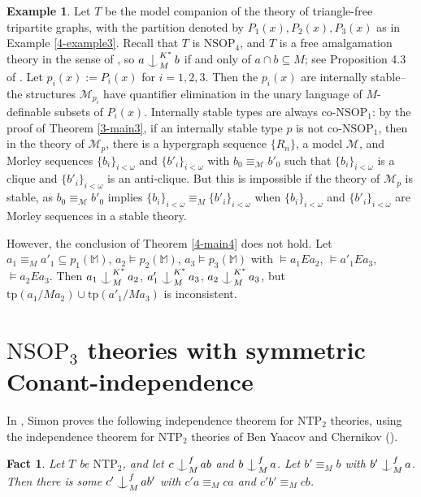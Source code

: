 \documentclass[12pt]{amsart}
\newtheorem{fact}[theorem]{Fact}
\theoremstyle{definition}
\newtheorem{example}[theorem]{Example}
\def\Ind#1#2{#1\setbox0=\hbox{$#1x$}\kern\wd0\hbox to 0pt{\hss$#1\mid$\hss}
\lower.9\ht0\hbox to 0pt{\hss$#1\smile$\hss}\kern\wd0}
\def\ind{\mathop{\mathpalette\Ind{}}}
\begin{document}
\begin{example}
    Let $T$ be the model companion of the theory of triangle-free tripartite graphs, with the partition denoted by $P_{1}(x), P_{2}(x), P_{3}(x)$ as in Example \ref{4-example3}. Recall that $T$ is $\mathrm{NSOP}_{4}$, and $T$ is a free amalgamation theory in the sense of \cite{Co15}, so $a \ind_{M}^{K^{*}} b$ if and only of $a \cap b \subseteq M$; see Proposition 4.3 of \cite{GFA}. Let $p_{i}(x) := P_{i}(x)$ for $i = 1, 2, 3$. Then the $p_{i}(x)$ are internally stable--the structures $\mathcal{M}_{p_{i}}$ have quantifier elimination in the unary language of $M$-definable subsets of $P_{i}(x)$. Internally stable types are always co-$\mathrm{NSOP}_{1}$: by the proof of Theorem \ref{3-main3}, if an internally stable type $p$ is not co-$\mathrm{NSOP}_{1}$, then in the theory of $\mathcal{M}_{p}$, there is a hypergraph sequence $\{R_{n}\}$, a model $\mathcal{M}$, and Morley sequences $\{b_{i}\}_{i < \omega}$ and $\{b'_{i}\}_{i < \omega}$ with $b_{0} \equiv_{\mathcal{M}}b'_{0}$ such that $\{b_{i}\}_{i < \omega}$ is a clique and $\{b'_{i}\}_{i < \omega}$ is an anti-clique. But this is impossible if the theory of $\mathcal{M}_{p}$ is stable, as $b_{0} \equiv_{\mathcal{M}}b'_{0}$ implies $\{b_{i}\}_{i < \omega} \equiv_{M} \{b'_{i}\}_{i < \omega}$ when $\{b_{i}\}_{i < \omega}$ and $\{b'_{i}\}_{i < \omega}$ are Morley sequences in a stable theory.

    However, the conclusion of Theorem \ref{4-main4} does not hold.  Let $a_{1} \equiv_{M} a'_{1} \subseteq p_{1}(\mathbb{M})$, $ a_{2} \models p_{2}(\mathbb{M})$,  $ a_{3} \models p_{3}(\mathbb{M})$ with $\models a_{1} E a_{2}$, $\models a'_{1} E a_{3}$, $\models a_{2} E a_{3}$. Then $a_{1} \ind^{K^{*}}_{M} a_{2}$, $a'_{1} \ind^{K^{*}}_{M} a_{3}$, $a_{2} \ind^{K^{*}}_{M} a_{3}$, but $\mathrm{tp}(a_{1}/Ma_{2}) \cup \mathrm{tp}(a'_{1}/Ma_{3})$ is inconsistent.
\end{example}


\section{$\mathrm{NSOP}_{3}$ theories with symmetric Conant-independence}

In \cite{Sim20}, Simon proves the following independence theorem for $\mathrm{NTP}_{2}$ theories, using the independence theorem for $\mathrm{NTP}_{2}$ theories of Ben Yaacov and Chernikov (\cite{BYC07}).

\begin{fact}\label{4-indntp2}
Let $T$ be $\mathrm{NTP}_{2}$, and let $c \ind^{f}_{M} ab$ and $b \ind^{f}_{M} a$. Let $b' \equiv_{M} b$ with $b' \ind^{f}_{M} a$. Then there is some $c' \ind^{f}_{M} ab'$ with $c'a \equiv_{M} ca$ and $c'b' \equiv_{M} cb$.
\end{fact}
\end{document}
